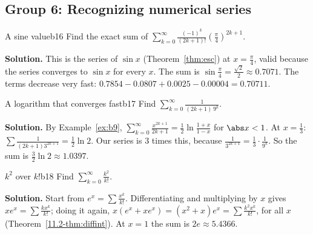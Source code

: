 \documentclass[11pt]{article}
\begin{document}
\subsection*{Group 6: Recognizing numerical series}

\begin{exmp}{A sine value}{b16}
Find the exact sum of $\displaystyle\sum_{k=0}^\infty\frac{(-1)^k}{(2k+1)!}\left(\frac\pi4\right)^{2k+1}$.

\textbf{Solution.} This is the series of $\sin x$ (Theorem~\ref{thm:esc}) at $x=\frac\pi4$, valid because the series converges to $\sin x$ for every $x$. The sum is $\sin\frac\pi4=\frac{\sqrt2}2\approx0.7071$. The terms decrease very fast: $0.7854-0.0807+0.0025-0.00004=0.70711$.
\end{exmp}

\begin{exmp}{A logarithm that converges fast}{b17}
Find $\displaystyle\sum_{k=0}^\infty\frac1{(2k+1)\,9^k}$.

\textbf{Solution.} By Example~\ref{ex:b9}, $\sum_{k=0}^\infty\frac{x^{2k+1}}{2k+1}=\frac12\ln\frac{1+x}{1-x}$ for $\abs x<1$. At $x=\frac13$: $\sum\frac1{(2k+1)3^{2k+1}}=\frac12\ln2$. Our series is $3$ times this, because $\frac1{3^{2k+1}}=\frac13\cdot\frac1{9^k}$. So the sum is $\frac32\ln2\approx1.0397$.
\end{exmp}

\begin{exmp}{$k^2$ over $k!$}{b18}
Find $\displaystyle\sum_{k=0}^\infty\frac{k^2}{k!}$.

\textbf{Solution.} Start from $e^x=\sum\frac{x^k}{k!}$. Differentiating and multiplying by $x$ gives $xe^x=\sum\frac{kx^k}{k!}$; doing it again, $x(e^x+xe^x)=(x^2+x)e^x=\sum\frac{k^2x^k}{k!}$, for all $x$ (Theorem~\ref{11.2-thm:diffint}). At $x=1$ the sum is $2e\approx5.4366$.
\end{exmp}
\end{document}
